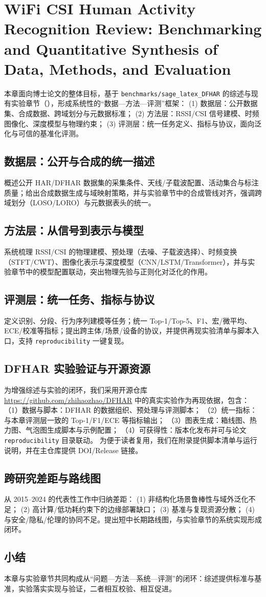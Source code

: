 \chapter{WiFi CSI Human Activity Recognition Review: Benchmarking and Quantitative Synthesis of Data, Methods, and Evaluation}
\label{chap:review}

本章面向博士论文的整体目标，基于 \texttt{benchmarks/sage\_latex\_DFHAR} 的综述与现有实验章节（），形成系统性的“数据—方法—评测”框架：
(1) 数据层：公开数据集、合成数据、跨域划分与元数据标准；
(2) 方法层：RSSI/CSI 信号建模、时频图像化、深度模型与物理约束；
(3) 评测层：统一任务定义、指标与协议，面向泛化与可信的基准化评测。

\section{数据层：公开与合成的统一描述}
概述公开 HAR/DFHAR 数据集的采集条件、天线/子载波配置、活动集合与标注质量；给出合成数据生成与域映射策略，并与实验章节中的合成管线对齐，强调跨域划分（LOSO/LORO）与元数据表头的统一。

\section{方法层：从信号到表示与模型}
系统梳理 RSSI/CSI 的物理建模、预处理（去噪、子载波选择）、时频变换（STFT/CWT）、图像化表示与深度模型（CNN/LSTM/Transformer），并与实验章节中的模型配置联动，突出物理先验与正则化对泛化的作用。

\section{评测层：统一任务、指标与协议}
定义识别、分段、行为序列建模等任务；统一 Top-1/Top-5、F1、宏/微平均、ECE/校准等指标；提出跨主体/场景/设备的协议，并提供再现实验清单与脚本入口，支持 \texttt{reproducibility} 一键复现。

\section{DFHAR 实验验证与开源资源}
为增强综述与实验的闭环，我们采用开源仓库 \url{https://github.com/zhihaozhao/DFHAR} 中的真实实验作为再现依据，包含：
（1）数据与脚本：DFHAR 的数据组织、预处理与评测脚本；
（2）统一指标：与本章评测层一致的 Top-1/F1/ECE 等指标输出；
（3）图表生成：箱线图、热力图、气泡图生成脚本与示例配置；
（4）可获得性：版本化发布并可与论文 \texttt{reproducibility} 目录联动。
为便于读者复用，我们在附录提供脚本清单与运行说明，并在主仓库提供 DOI/Release 链接。

\section{跨研究差距与路线图}
从 2015–2024 的代表性工作中归纳差距：
(1) 非结构化场景鲁棒性与域外泛化不足；
(2) 高计算/低功耗约束下的边缘部署缺口；
(3) 基准与复现资源分散；
(4) 与安全/隐私/伦理的协同不足。提出短中长期路线图，与实验章节的系统实现形成闭环。

\section{小结}
本章与实验章节共同构成从“问题—方法—系统—评测”的闭环：综述提供标准与基准，实验落实实现与验证，二者相互校验、相互促进。
